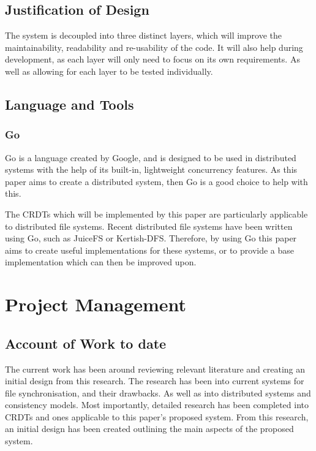 \documentclass[12pt]{article}
\begin{document}
\subsection{Justification of Design}
The system is decoupled into three distinct layers, which will improve the maintainability, readability and re-usability of the code. It will also help during development, as each layer will only need to focus on its own requirements. As well as allowing for each layer to be tested individually. \par

\subsection{Language and Tools}
\subsubsection{Go}
Go is a language created by Google, and is designed to be used in distributed systems with the help of its built-in, lightweight concurrency features. As this paper aims to create a distributed system, then Go is a good choice to help with this. \par

The CRDTs which will be implemented by this paper are particularly applicable to distributed file systems. Recent distributed file systems have been written using Go, such as JuiceFS or Kertish-DFS. Therefore, by using Go this paper aims to create useful implementations for these systems, or to provide a base implementation which can then be improved upon. \par

\section{Project Management}

\subsection{Account of Work to date}
The current work has been around reviewing relevant literature and creating an initial design from this research. The research has been into current systems for file synchronisation, and their drawbacks. As well as into distributed systems and consistency models. Most importantly, detailed research has been completed into CRDTs and ones applicable to this paper's proposed system. From this research, an initial design has been created outlining the main aspects of the proposed system.
\end{document}
